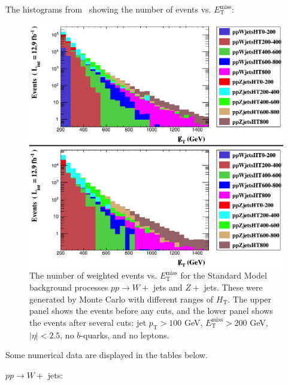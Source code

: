 The histograms from \madanalysis\ showing the number of events vs. $E_{\mathrm{T}}^{\mathrm{miss}}$:

\begin{figure}[H]
\centering
\includegraphics[width=160mm]{./sec15/MET_HTranges.png}
\caption{The number of weighted events vs. $E_{\mathrm{T}}^{\mathrm{miss}}$ for the Standard Model background processes $pp \rightarrow W +$ jets and $Z +$ jets. These were generated by Monte Carlo with different ranges of $H_{\mathrm{T}}$. The upper panel shows the events before any cuts, and the lower panel shows the events after several cuts: jet $p_{\mathrm{T}} > 100$ GeV, $E_{\mathrm{T}}^{\mathrm{miss}} > 200$ GeV, $|\eta| < 2.5$, no $b$-quarks, and no leptons.}
\end{figure}

Some numerical data are displayed in the tables below.

$pp \rightarrow W +$ jets:

